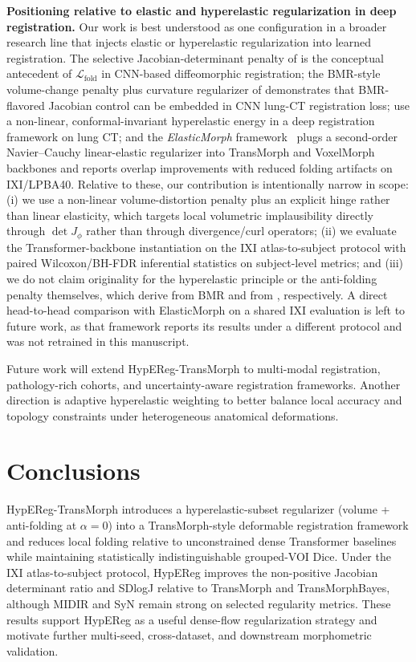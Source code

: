 \documentclass[11pt,a4paper]{article}
\begin{document}
\noindent\textbf{Positioning relative to elastic and hyperelastic regularization in deep registration.}
Our work is best understood as one configuration in a broader research line that injects elastic or hyperelastic regularization into learned registration. The selective Jacobian-determinant penalty of \citet{mok2020fast} is the conceptual antecedent of $\mathcal{L}_{\mathrm{fold}}$ in CNN-based diffeomorphic registration; the BMR-style volume-change penalty plus curvature regularizer of \citet{hering2021lung} demonstrates that BMR-flavored Jacobian control can be embedded in CNN lung-CT registration loss; \citet{zou2023conformal} use a non-linear, conformal-invariant hyperelastic energy in a deep registration framework on lung CT; and the \emph{ElasticMorph} framework~\citep{elasticmorph2025} plugs a second-order Navier--Cauchy linear-elastic regularizer into TransMorph and VoxelMorph backbones and reports overlap improvements with reduced folding artifacts on IXI/LPBA40. Relative to these, our contribution is intentionally narrow in scope: (i) we use a non-linear volume-distortion penalty plus an explicit hinge rather than linear elasticity, which targets local volumetric implausibility directly through $\det J_\phi$ rather than through divergence/curl operators; (ii) we evaluate the Transformer-backbone instantiation on the IXI atlas-to-subject protocol with paired Wilcoxon/BH-FDR inferential statistics on subject-level metrics; and (iii) we do not claim originality for the hyperelastic principle or the anti-folding penalty themselves, which derive from BMR \citep{burger2013hyperelastic} and from \citet{mok2020fast}, respectively. A direct head-to-head comparison with ElasticMorph on a shared IXI evaluation is left to future work, as that framework reports its results under a different protocol and was not retrained in this manuscript.

Future work will extend HypEReg-TransMorph to multi-modal registration, pathology-rich cohorts, and uncertainty-aware registration frameworks. Another direction is adaptive hyperelastic weighting to better balance local accuracy and topology constraints under heterogeneous anatomical deformations.

\section{Conclusions}

HypEReg-TransMorph introduces a hyperelastic-subset regularizer (volume + anti-folding at \(\alpha=0\)) into a TransMorph-style deformable registration framework and reduces local folding relative to unconstrained dense Transformer baselines while maintaining statistically indistinguishable grouped-VOI Dice. Under the IXI atlas-to-subject protocol, HypEReg improves the non-positive Jacobian determinant ratio and SDlogJ relative to TransMorph and TransMorphBayes, although MIDIR and SyN remain strong on selected regularity metrics. These results support HypEReg as a useful dense-flow regularization strategy and motivate further multi-seed, cross-dataset, and downstream morphometric validation.
\end{document}
